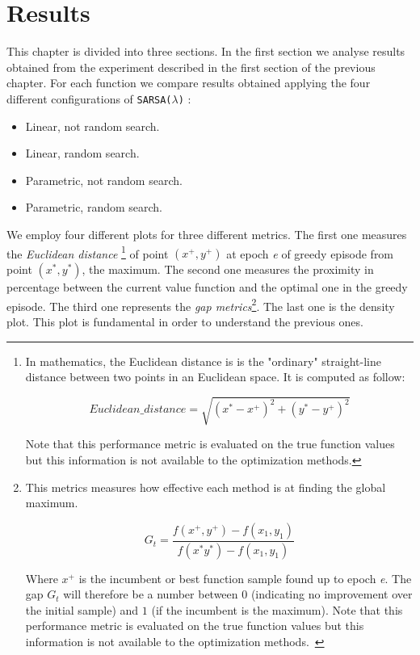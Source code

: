 \chapter{Results}

This chapter is divided into three sections. In the first section we analyse results obtained from the experiment described in the first section of the previous chapter. For each function we compare results obtained applying the four different configurations of {\tt SARSA($\lambda$)} :

\begin{itemize}
	\item Linear, not random search.
	\item Linear, random search.
	\item Parametric, not random search.
	\item Parametric, random search.
\end{itemize}

We employ four different plots for three different metrics. The first one measures the \textit{Euclidean distance} \footnote{In mathematics, the Euclidean distance is is the "ordinary" straight-line distance between two points in an Euclidean space. It is computed as follow: 
	
	\begin{equation}
		Euclidean\_distance = \sqrt{(x^* - x^+)^2 + (y^* - y^+)^2}
	\end{equation}
	
Note that this performance metric is evaluated on the true function values but this information is not available to the optimization methods. 

} of point $(x^+, y^+)$ at epoch \textit{e} of greedy episode from point $(x^*, y^*)$, the maximum. The second one measures the proximity in percentage between the current value function and the optimal one in the greedy episode. The third one represents the \textit{gap metrics}\footnote{This metrics measures how effective each method is at finding the global maximum.

\begin{equation}
G_t = \dfrac{f(x^+, y^+) - f(x_1, y_1)}{f(x^* y^*) - f(x_1, y_1)}
\end{equation}

Where $x^+$ is the incumbent or best function sample found up to epoch \textit{e}. The gap $G_t$ will therefore be a number between $0$ (indicating no improvement over the initial sample) and $1$ (if the incumbent is the maximum). Note that this performance metric is evaluated on the true function values but this information is not available to the optimization methods.~\cite{Hoffman:2011:PAB:3020548.3020587}

}. The last one is the density plot. This plot is fundamental in order to understand the previous ones. 

